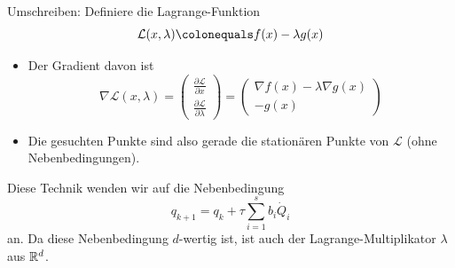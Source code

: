 Umschreiben: Definiere die Lagrange-Funktion
\begin{equation*}
	\mathcal{L}(x,\lambda) \colonequals f(x) - \lambda g(x)
\end{equation*}
\begin{itemize}
	\item Der Gradient davon ist
	\begin{equation*}
		\nabla\mathcal{L}(x,\lambda) =
		\begin{pmatrix}
		\frac{\partial\mathcal{L}}{\partial x} \\
		\frac{\partial\mathcal{L}}{\partial \lambda}
		\end{pmatrix} =
		\begin{pmatrix}
		\nabla f(x) - \lambda \nabla g(x) \\ -g(x)
		\end{pmatrix}
	\end{equation*}
	\item Die gesuchten Punkte sind also gerade die stationären Punkte von $\mathcal{L}$ (ohne Nebenbedingungen).
\end{itemize}

\bigskip

Diese Technik wenden wir auf die Nebenbedingung
\begin{equation*}
	q_{k+1} = q_k + \tau\sum_{i=1}^s b_i\dot{Q}_i
\end{equation*}
an. Da diese Nebenbedingung $d$-wertig ist, ist auch der Lagrange-Multiplikator $\lambda$ aus $\mathbb R^d$.

